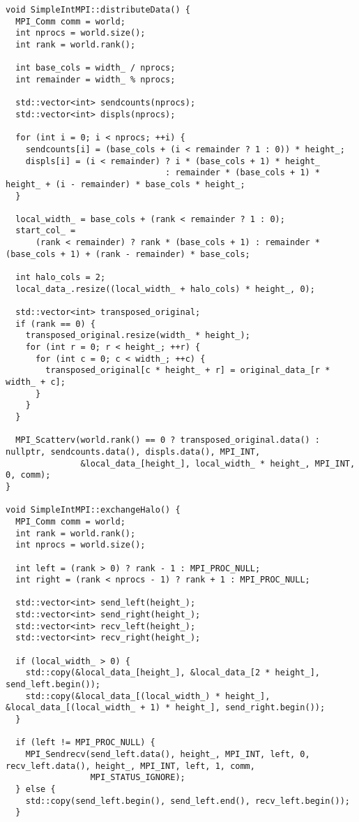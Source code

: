 \documentclass[12pt]{article}
\begin{document}
\begin{lstlisting}
void SimpleIntMPI::distributeData() {
  MPI_Comm comm = world;
  int nprocs = world.size();
  int rank = world.rank();

  int base_cols = width_ / nprocs;
  int remainder = width_ % nprocs;

  std::vector<int> sendcounts(nprocs);
  std::vector<int> displs(nprocs);

  for (int i = 0; i < nprocs; ++i) {
    sendcounts[i] = (base_cols + (i < remainder ? 1 : 0)) * height_;
    displs[i] = (i < remainder) ? i * (base_cols + 1) * height_
                                : remainder * (base_cols + 1) * height_ + (i - remainder) * base_cols * height_;
  }

  local_width_ = base_cols + (rank < remainder ? 1 : 0);
  start_col_ =
      (rank < remainder) ? rank * (base_cols + 1) : remainder * (base_cols + 1) + (rank - remainder) * base_cols;

  int halo_cols = 2;
  local_data_.resize((local_width_ + halo_cols) * height_, 0);

  std::vector<int> transposed_original;
  if (rank == 0) {
    transposed_original.resize(width_ * height_);
    for (int r = 0; r < height_; ++r) {
      for (int c = 0; c < width_; ++c) {
        transposed_original[c * height_ + r] = original_data_[r * width_ + c];
      }
    }
  }

  MPI_Scatterv(world.rank() == 0 ? transposed_original.data() : nullptr, sendcounts.data(), displs.data(), MPI_INT,
               &local_data_[height_], local_width_ * height_, MPI_INT, 0, comm);
}

void SimpleIntMPI::exchangeHalo() {
  MPI_Comm comm = world;
  int rank = world.rank();
  int nprocs = world.size();

  int left = (rank > 0) ? rank - 1 : MPI_PROC_NULL;
  int right = (rank < nprocs - 1) ? rank + 1 : MPI_PROC_NULL;

  std::vector<int> send_left(height_);
  std::vector<int> send_right(height_);
  std::vector<int> recv_left(height_);
  std::vector<int> recv_right(height_);

  if (local_width_ > 0) {
    std::copy(&local_data_[height_], &local_data_[2 * height_], send_left.begin());
    std::copy(&local_data_[(local_width_) * height_], &local_data_[(local_width_ + 1) * height_], send_right.begin());
  }

  if (left != MPI_PROC_NULL) {
    MPI_Sendrecv(send_left.data(), height_, MPI_INT, left, 0, recv_left.data(), height_, MPI_INT, left, 1, comm,
                 MPI_STATUS_IGNORE);
  } else {
    std::copy(send_left.begin(), send_left.end(), recv_left.begin());
  }


\end{lstlisting}
\end{document}
